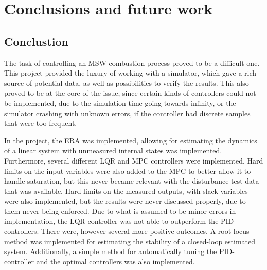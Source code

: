 \chapter{Conclusions and future work}\label{cha:conclusions}

\section{Conclustion}

The task of controlling an MSW combustion process proved to be a difficult one. This project provided the luxury of working with a simulator, which gave a rich source of potential data, as well as possibilities to verify the results. This also proved to be at the core of the issue, since certain kinds of controllers could not be implemented, due to the simulation time going towards infinity, or the simulator crashing with unknown errors, if the controller had discrete samples that were too frequent. 

\noindent
In the project, the ERA  was implemented, allowing for estimating the dynamics of a linear system with unmeasured internal states was implemented. Furthermore, several different LQR and MPC controllers were implemented. Hard limits on the input-variables were also added to the MPC to better allow it to handle saturation, but this never became relevant with the disturbance test-data that was available. Hard limits on the measured outputs, with slack variables  were also implemented, but the results were never discussed properly, due to them never being enforced. Due to what is assumed to be minor errors in implementation, the LQR-controller was not able to outperform the PID-controllers. There were, however several more positive outcomes. A root-locus method was implemented for estimating the stability of a closed-loop estimated system. Additionally, a simple method for automatically tuning the PID- controller and the optimal controllers was also implemented. 

\noindent 



